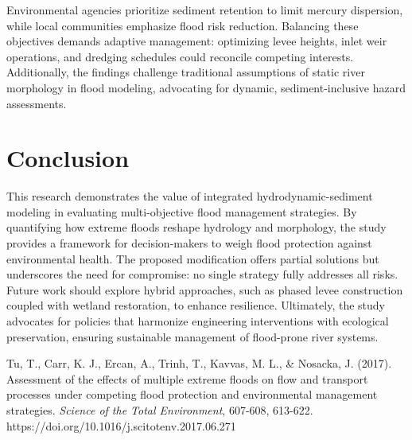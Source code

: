 \documentclass[a4paper, 11pt]{article}
\begin{document}
Environmental agencies prioritize sediment retention to limit mercury dispersion, while local communities emphasize flood risk reduction. Balancing these objectives demands adaptive management: optimizing levee heights, inlet weir operations, and dredging schedules could reconcile competing interests. Additionally, the findings challenge traditional assumptions of static river morphology in flood modeling, advocating for dynamic, sediment-inclusive hazard assessments.

\section{Conclusion}
\hspace*{0.5cm}This research demonstrates the value of integrated hydrodynamic-sediment modeling in evaluating multi-objective flood management strategies. By quantifying how extreme floods reshape hydrology and morphology, the study provides a framework for decision-makers to weigh flood protection against environmental health. The proposed modification offers partial solutions but underscores the need for compromise: no single strategy fully addresses all risks. Future work should explore hybrid approaches, such as phased levee construction coupled with wetland restoration, to enhance resilience. Ultimately, the study advocates for policies that harmonize engineering interventions with ecological preservation, ensuring sustainable management of flood-prone river systems.

\newpage
\begin{thebibliography}{99} 

 Tu, T., Carr, K. J., Ercan, A., Trinh, T., Kavvas, M. L., \& Nosacka, J. (2017). Assessment of the effects of multiple extreme floods on flow and transport processes under competing flood protection and environmental management strategies. \textit{Science of the Total Environment}, 607-608, 613-622. https://doi.org/10.1016/j.scitotenv.2017.06.271

  

\end{thebibliography}
\end{document}
